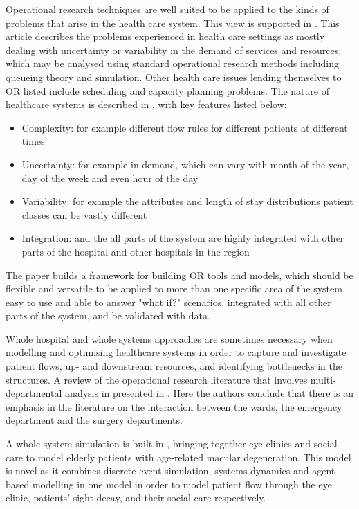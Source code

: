 \documentclass{article}
\begin{document}
Operational research techniques are well suited to be applied to the kinds of problems that arise in the health care system.
This view is supported in \cite{buhaug02}.
This article describes the problems experienced in health care settings as mostly dealing with uncertainty or variability in the demand of services and resources, which may be analysed using standard operational research methods including queueing theory and simulation.
Other health care issues lending themselves to OR listed include scheduling and capacity planning problems.
The nature of healthcare systems is described in \cite{harper02}, with key features listed below:
\begin{itemize}
    \item Complexity: for example different flow rules for different patients at different times
    \item Uncertainty: for example in demand, which can vary with month of the year, day of the week and even hour of the day
    \item Variability: for example the attributes and length of stay distributions patient classes can be vastly different
    \item Integration: and the all parts of the system are highly integrated with other parts of the hospital and other hospitals in the region
\end{itemize}
The paper builds a framework for building OR tools and models, which should be flexible and versatile to be applied to more than one specific area of the system, easy to use and able to answer "what if?" scenarios, integrated with all other parts of the system, and be validated with data.

Whole hospital and whole systems approaches are sometimes necessary when modelling and optimising healthcare systems in order to capture and investigate patient flows, up- and downstream resources, and identifying bottlenecks in the structures.
A review of the operational research literature that involves multi-departmental analysis in presented in \cite{twente09}.
Here the authors conclude that there is an emphasis in the literature on the interaction between the wards, the emergency department and the surgery departments.

A whole system simulation is built in \cite{vianaetal12}, bringing together eye clinics and social care to model elderly patients with age-related macular degeneration.
This model is novel as it combines discrete event simulation, systems dynamics and agent-based modelling in one model in order to model patient flow through the eye clinic, patients' sight decay, and their social care respectively.
\end{document}
